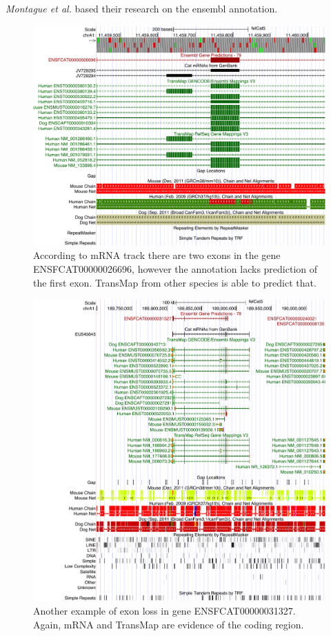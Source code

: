 \documentclass{article}
\begin{document}
\textit{Montague et al.} based their research on the ensembl annotation.


\begin{figure}[h]
\centering
\includegraphics[width=\textwidth]{images/hgt_hgwdev_e926_52a620.pdf}
\caption{According to mRNA track there are two exons in the gene ENSFCAT00000026696, however the annotation lacks prediction of the first exon. TransMap from other species is able to predict that.}
\label{fig:missed_exons_mrna_1}
\end{figure}

\begin{figure}[h]
\centering
\includegraphics[width=\textwidth]{images/hgt_hgwdev_ed86_52bfa0.pdf}
\caption{Another example of exon loss in gene ENSFCAT00000031327. Again, mRNA and TransMap are evidence of the coding region.}
\label{fig:missed_exons_mrna_2}
\end{figure}
\end{document}
